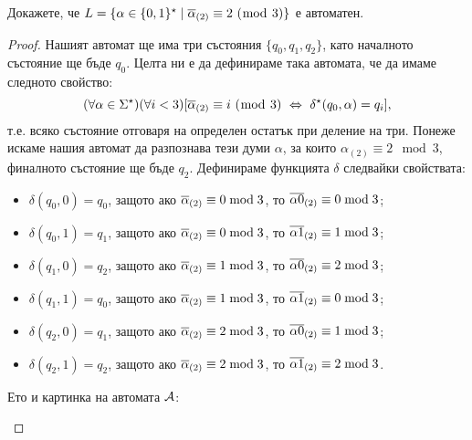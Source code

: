 \begin{problem}
  Докажете, че $L = \{\alpha \in \{0,1\}^\star \mid \overline{\alpha}_{(2)} \equiv 2\ (\bmod\ 3)\}$ е автоматен.
\end{problem}
\begin{proof}
  Нашият автомат ще има три състояния $\{q_0,q_1,q_2\}$, като началното състояние ще бъде $q_0$.
  Целта ни е да дефинираме така автомата, че да имаме следното свойство:
  \begin{equation}
    (\forall\alpha\in\Sigma^\star)(\forall i < 3)[\ov{\alpha}_{(2)} \equiv i\ (\bmod\ 3)\ \Leftrightarrow\ \delta^\star(q_0,\alpha) = q_i],
  \end{equation}
  т.е. всяко състояние отговаря на определен остатък при деление на три.
  Понеже искаме нашия автомат да разпознава тези думи $\alpha$,
  за които $\alpha_{(2)} \equiv 2\mod 3$, финалното състояние ще бъде $q_2$.
  Дефинираме функцията $\delta$ следвайки свойствата:
  \begin{itemize}
  \item
    $\delta(q_0,0) = q_0$, защото ако $\overline{\alpha}_{(2)} \equiv 0 \bmod 3$, то $\overline{\alpha 0}_{(2)} \equiv 0 \bmod 3$;
  \item 
    $\delta(q_0,1) = q_1$, защото ако $\overline{\alpha}_{(2)} \equiv 0 \bmod 3$, то $\overline{\alpha 1}_{(2)} \equiv 1 \bmod 3$;
  \item
    $\delta(q_1,0) = q_2$, защото ако $\overline{\alpha}_{(2)} \equiv 1 \bmod 3$, то $\overline{\alpha 0}_{(2)} \equiv 2 \bmod 3$;
  \item 
    $\delta(q_1,1) = q_0$, защото ако $\overline{\alpha}_{(2)} \equiv 1 \bmod 3$, то $\overline{\alpha 1}_{(2)} \equiv 0 \bmod 3$;
  \item
    $\delta(q_2,0) = q_1$, защото ако $\overline{\alpha}_{(2)} \equiv 2 \bmod 3$, то $\overline{\alpha 0}_{(2)} \equiv 1 \bmod 3$;
  \item 
    $\delta(q_2,1) = q_2$, защото ако $\overline{\alpha}_{(2)} \equiv 2 \bmod 3$, то $\overline{\alpha 1}_{(2)} \equiv 2 \bmod 3$.
  \end{itemize}
  Ето и картинка на автомата $\mathcal{A}$:
  \begin{framed}
  \begin{figure}[H]
    \begin{center}
\end{center}
\end{figure}
\end{framed}
\end{proof}
